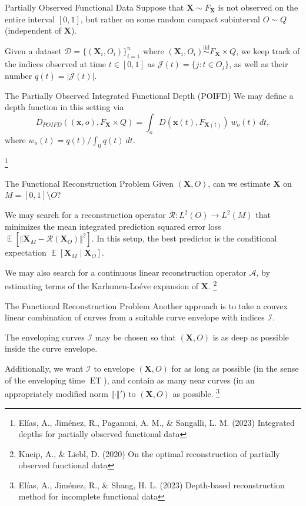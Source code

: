 \documentclass[handout, notes]{beamer}
\newcommand{\vx}{\bm{x}}
\newcommand{\vX}{\bm{X}}
\newcommand{\iid}{\overset{\text{iid}}{\sim}}
\DeclareMathOperator{\E}{\mathbb{E}}
\DeclareMathOperator{\ET}{ET}
\newcommand{\norm}[1]{\Vert #1 \Vert}
\newcommand\blfootnote[1]{%
  \begingroup
  \renewcommand\thefootnote{}\footnote{#1}%
  \addtocounter{footnote}{-1}%
  \endgroup
}
\begin{document}
    \begin{frame}{Partially Observed Functional Data}
        Suppose that $\vX \sim F_{\vX}$ is not observed on the entire interval
        $[0, 1]$, but rather on some random compact subinterval $O \sim Q$
        (independent of $\vX$).

        Given a dataset $\mathscr{D} = \{(\vX_i, O_i)\}_{i = 1}^n$ where
        $(\vX_i, O_i) \iid F_{\vX} \times Q$, we keep track of the indices
        observed at time $t \in [0, 1]$ as $\mathscr{J}(t) = \{j\colon t \in
        O_j\}$, as well as their number $q(t) = |\mathscr{J}(t)|$.
    \end{frame}

    \begin{frame}{The Partially Observed Integrated Functional Depth (POIFD)}
        We may define a depth function in this setting via \[
            D_{POIFD}((\vx, o), F_{\vX} \times Q) = \int_{o} D(\vx(t), F_{\vX(t)}) \:w_o(t)\:dt,
        \] where $w_o(t) = q(t) / \int_0 q(t)\:dt$.

        \blfootnote{
            El\'ias, A., Jim\'enez, R., Paganoni, A. M., \& Sangalli, L. M.
            (2023) Integrated depths for partially observed functional data
        }
    \end{frame}


    \begin{frame}{The Functional Reconstruction Problem}
        Given $(\vX, O)$, can we estimate $\vX$ on $M = [0, 1]\setminus O$?

        We may search for a reconstruction operator $\mathcal{R}\colon L^2(O)
        \to L^2(M)$ that minimizes the mean integrated prediction squared
        error loss $\E[\norm{\vX_M - \mathcal{R}(\vX_O)}^2]$.
        In this setup, the best predictor is the conditional expectation
        $\E[\vX_M \mid \vX_O]$.

        We may also search for a continuous linear reconstruction operator
        $\mathscr{A}$, by estimating terms of the Karhunen-Lo\'eve expansion
        of $\vX$.
        \blfootnote{
            Kneip, A., \& Liebl, D. (2020) On the optimal reconstruction of
            partially observed functional data
        }
    \end{frame}


    \begin{frame}{The Functional Reconstruction Problem}
        Another approach is to take a convex linear combination of curves from
        a suitable curve envelope with indices $\mathscr{I}$.

        The enveloping curves $\mathscr{I}$ may be chosen so that $(\vX, O)$
        is as deep as possible inside the curve envelope.

        Additionally, we want $\mathscr{I}$ to envelope $(\vX, O)$ for as long
        as possible (in the sense of the enveloping time $\ET$), and contain
        as many near curves (in an appropriately modified norm
        $\norm{\cdot}'$) to $(\vX, O)$ as possible.
        \blfootnote{
            El\'ias, A., Jim\'enez, R., \& Shang, H. L. (2023) Depth-based
            reconstruction method for incomplete functional data
        }
    \end{frame}
\end{document}
